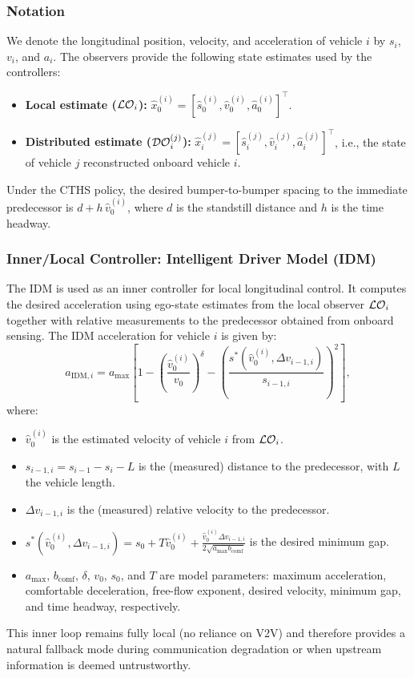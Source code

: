 \subsubsection{Notation}
We denote the longitudinal position, velocity, and acceleration of vehicle $i$ by $s_i$, $v_i$, and $a_i$. The observers provide the following state estimates used by the controllers:
\begin{itemize}
    \item \textbf{Local estimate ($\mathcal{LO}_i$):} $\hat{x}_0^{(i)} = [\hat{s}_0^{(i)}, \hat{v}_0^{(i)}, \hat{a}_0^{(i)}]^\top$.
    \item \textbf{Distributed estimate ($\mathcal{DO}_i^{(j)}$):} $\hat{x}_i^{(j)} = [\hat{s}_i^{(j)}, \hat{v}_i^{(j)}, \hat{a}_i^{(j)}]^\top$, i.e., the state of vehicle $j$ reconstructed onboard vehicle $i$.
\end{itemize}
Under the CTHS policy, the desired bumper-to-bumper spacing to the immediate predecessor is $d + h\,\hat{v}_0^{(i)}$, where $d$ is the standstill distance and $h$ is the time headway.

\subsubsection{Inner/Local Controller: Intelligent Driver Model (IDM)}
The IDM is used as an inner controller for local longitudinal control. It computes the desired acceleration using ego-state estimates from the local observer $\mathcal{LO}_i$ together with relative measurements to the predecessor obtained from onboard sensing. The IDM acceleration for vehicle $i$ is given by:
\begin{equation}
    a_{\text{IDM},i} = a_{\max} \left[ 1 - \left( \frac{\hat{v}_0^{(i)}}{v_0} \right)^\delta - \left( \frac{s^*(\hat{v}_0^{(i)}, \Delta v_{i-1,i})}{s_{i-1,i}} \right)^2 \right],
\end{equation}
where:
\begin{itemize}
    \item $\hat{v}_0^{(i)}$ is the estimated velocity of vehicle $i$ from $\mathcal{LO}_i$.
    \item $s_{i-1,i} = s_{i-1} - s_i - L$ is the (measured) distance to the predecessor, with $L$ the vehicle length.
    \item $\Delta v_{i-1,i}$ is the (measured) relative velocity to the predecessor.
    \item $s^*(\hat{v}_0^{(i)}, \Delta v_{i-1,i}) = s_0 + T \hat{v}_0^{(i)} + \frac{\hat{v}_0^{(i)} \Delta v_{i-1,i}}{2 \sqrt{a_{\max} b_{\text{comf}}}}$ is the desired minimum gap.
    \item $a_{\max}$, $b_{\text{comf}}$, $\delta$, $v_0$, $s_0$, and $T$ are model parameters: maximum acceleration, comfortable deceleration, free-flow exponent, desired velocity, minimum gap, and time headway, respectively.
\end{itemize}
This inner loop remains fully local (no reliance on V2V) and therefore provides a natural fallback mode during communication degradation or when upstream information is deemed untrustworthy.

